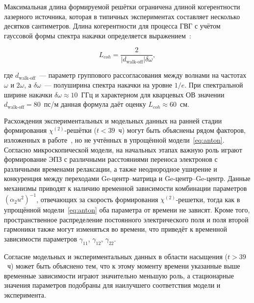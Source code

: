 Максимальная длина формируемой решётки ограничена длиной когерентности лазерного источника, которая в типичных экспериментах составляет несколько десятков сантиметров. Длина когерентности для процесса ГВГ с учётом гауссовой формы спектра накачки определяется выражением~\cite{agrawal2019}:

\begin{equation}
	L_{coh} = \frac{2}{|d_{\text{walk-off}}| \delta \omega},
\end{equation}


где $d_{\text{walk-off}}$~--- параметр группового рассогласования между волнами на частотах $\omega$ и $2\omega$, а $\delta \omega$~--- полуширина спектра накачки на уровне $1/e$. При спектральной ширине накачки $\delta \omega \approx 10$~ГГц и характерном для кварцевых ОВ значении $d_{\text{walk-off}} = 80$~пс/м данная формула даёт оценку $L_{coh} \approx 60$~см.

Расхождения экспериментальных и модельных данных на ранней стадии формирования \(\chi^{(2)}\)-решётки (\(t < 39\)~ч) могут быть объяснены рядом факторов, изложенных в работе~\cite{antonyuk2001self}, но не учтённых в упрощённой модели~\eqref{eq:anton}. Согласно микроскопической модели, на начальных этапах важную роль играют формирование ЭПЗ с различными расстояниями переноса электронов с различными временами релаксации, а также неоднородное уширение и конкуренция между переходами Ge-центр–матрица и Ge-центр–Ge-центр. Данные механизмы приводят к наличию временной зависимости комбинации параметров $(\alpha_2 u^{2})^{-1}$, отвечающих за скорость формирования \(\chi^{(2)}\)-решетки, тогда как в упрощённой модели~\eqref{eq:anton} оба параметра от времени не зависят. Кроме того, пространственное распределение постоянного электрического поля и поля второй гармоники также могут изменяться во времени, что приведёт к временной зависимости параметров $\gamma_{11}$, $\gamma_{12}$, $\gamma_{22}$.

Согласие модельных и экспериментальных данных в области насыщения (\(t > 39\)~ч) может быть объяснено тем, что к этому моменту времени указанные выше временные зависимости играют значительно меньшую роль, а стационарные значения параметров подобраны для наилучшего соответствия модели и эксперимента. 

